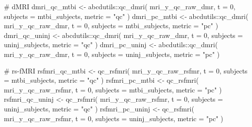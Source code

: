 \documentclass[
  letterpaper,
  DIV=11,
  numbers=noendperiod]{scrreprt}
\newenvironment{Shaded}{\begin{snugshade}}{\end{snugshade}}
\newcommand{\AttributeTok}[1]{\textcolor[rgb]{0.40,0.45,0.13}{#1}}
\newcommand{\CommentTok}[1]{\textcolor[rgb]{0.37,0.37,0.37}{#1}}
\newcommand{\DecValTok}[1]{\textcolor[rgb]{0.68,0.00,0.00}{#1}}
\newcommand{\FunctionTok}[1]{\textcolor[rgb]{0.28,0.35,0.67}{#1}}
\newcommand{\NormalTok}[1]{\textcolor[rgb]{0.00,0.23,0.31}{#1}}
\newcommand{\OtherTok}[1]{\textcolor[rgb]{0.00,0.23,0.31}{#1}}
\newcommand{\SpecialCharTok}[1]{\textcolor[rgb]{0.37,0.37,0.37}{#1}}
\newcommand{\StringTok}[1]{\textcolor[rgb]{0.13,0.47,0.30}{#1}}
\begin{document}
\begin{Shaded}
\begin{Highlighting}[]
\CommentTok{\# dMRI}
\NormalTok{dmri\_qc\_mtbi }\OtherTok{\textless{}{-}}\NormalTok{ abcdutils}\SpecialCharTok{::}\FunctionTok{qc\_dmri}\NormalTok{(}
\NormalTok{    mri\_y\_qc\_raw\_dmr,}
    \AttributeTok{t =} \DecValTok{0}\NormalTok{,}
    \AttributeTok{subjects =}\NormalTok{ mtbi\_subjects,}
    \AttributeTok{metric =} \StringTok{"qc"}
\NormalTok{)}
\NormalTok{dmri\_pc\_mtbi }\OtherTok{\textless{}{-}}\NormalTok{ abcdutils}\SpecialCharTok{::}\FunctionTok{qc\_dmri}\NormalTok{(}
\NormalTok{    mri\_y\_qc\_raw\_dmr,}
    \AttributeTok{t =} \DecValTok{0}\NormalTok{,}
    \AttributeTok{subjects =}\NormalTok{ mtbi\_subjects,}
    \AttributeTok{metric =} \StringTok{"pc"}
\NormalTok{)}
\NormalTok{dmri\_qc\_uninj }\OtherTok{\textless{}{-}}\NormalTok{ abcdutils}\SpecialCharTok{::}\FunctionTok{qc\_dmri}\NormalTok{(}
\NormalTok{    mri\_y\_qc\_raw\_dmr,}
    \AttributeTok{t =} \DecValTok{0}\NormalTok{,}
    \AttributeTok{subjects =}\NormalTok{ uninj\_subjects,}
    \AttributeTok{metric =} \StringTok{"qc"}
\NormalTok{)}
\NormalTok{dmri\_pc\_uninj }\OtherTok{\textless{}{-}}\NormalTok{ abcdutils}\SpecialCharTok{::}\FunctionTok{qc\_dmri}\NormalTok{(}
\NormalTok{    mri\_y\_qc\_raw\_dmr,}
    \AttributeTok{t =} \DecValTok{0}\NormalTok{,}
    \AttributeTok{subjects =}\NormalTok{ uninj\_subjects,}
    \AttributeTok{metric =} \StringTok{"pc"}
\NormalTok{)}

\CommentTok{\# rs{-}fMRI}
\NormalTok{rsfmri\_qc\_mtbi }\OtherTok{\textless{}{-}} \FunctionTok{qc\_rsfmri}\NormalTok{(}
\NormalTok{    mri\_y\_qc\_raw\_rsfmr,}
    \AttributeTok{t =} \DecValTok{0}\NormalTok{,}
    \AttributeTok{subjects =}\NormalTok{ mtbi\_subjects,}
    \AttributeTok{metric =} \StringTok{"qc"}
\NormalTok{)}
\NormalTok{rsfmri\_pc\_mtbi }\OtherTok{\textless{}{-}} \FunctionTok{qc\_rsfmri}\NormalTok{(}
\NormalTok{    mri\_y\_qc\_raw\_rsfmr,}
    \AttributeTok{t =} \DecValTok{0}\NormalTok{,}
    \AttributeTok{subjects =}\NormalTok{ mtbi\_subjects,}
    \AttributeTok{metric =} \StringTok{"pc"}
\NormalTok{)}
\NormalTok{rsfmri\_qc\_uninj }\OtherTok{\textless{}{-}} \FunctionTok{qc\_rsfmri}\NormalTok{(}
\NormalTok{    mri\_y\_qc\_raw\_rsfmr,}
    \AttributeTok{t =} \DecValTok{0}\NormalTok{,}
    \AttributeTok{subjects =}\NormalTok{ uninj\_subjects,}
    \AttributeTok{metric =} \StringTok{"qc"}
\NormalTok{)}
\NormalTok{rsfmri\_pc\_uninj }\OtherTok{\textless{}{-}} \FunctionTok{qc\_rsfmri}\NormalTok{(}
\NormalTok{    mri\_y\_qc\_raw\_rsfmr,}
    \AttributeTok{t =} \DecValTok{0}\NormalTok{,}
    \AttributeTok{subjects =}\NormalTok{ uninj\_subjects,}
    \AttributeTok{metric =} \StringTok{"pc"}
\NormalTok{)}


\end{Highlighting}
\end{Shaded}
\end{document}
